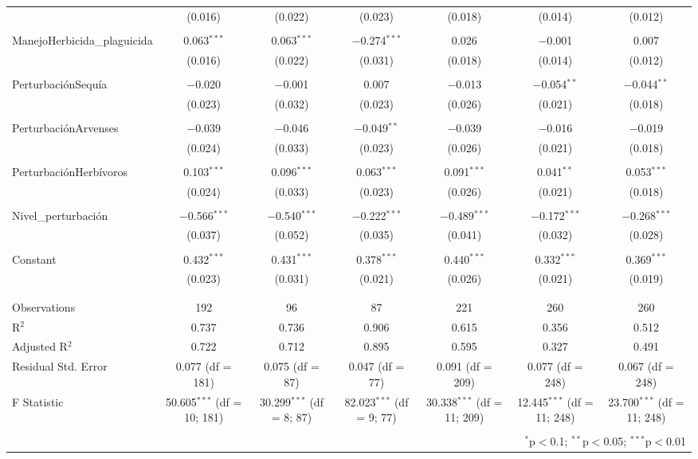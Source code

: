 \documentclass[spanish,11pt]{article}
\begin{document}
\begin{table}[!htbp]
\begin{tabular}{@{\extracolsep{5pt}}lcccccc}
  & (0.016) & (0.022) & (0.023) & (0.018) & (0.014) & (0.012) \\ 
  & & & & & & \\ 
 ManejoHerbicida\_plaguicida & 0.063$^{***}$ & 0.063$^{***}$ & $-$0.274$^{***}$ & 0.026 & $-$0.001 & 0.007 \\ 
  & (0.016) & (0.022) & (0.031) & (0.018) & (0.014) & (0.012) \\ 
  & & & & & & \\ 
 PerturbaciónSequía & $-$0.020 & $-$0.001 & 0.007 & $-$0.013 & $-$0.054$^{**}$ & $-$0.044$^{**}$ \\ 
  & (0.023) & (0.032) & (0.023) & (0.026) & (0.021) & (0.018) \\ 
  & & & & & & \\ 
 PerturbaciónArvenses & $-$0.039 & $-$0.046 & $-$0.049$^{**}$ & $-$0.039 & $-$0.016 & $-$0.019 \\ 
  & (0.024) & (0.033) & (0.023) & (0.026) & (0.021) & (0.018) \\ 
  & & & & & & \\ 
 PerturbaciónHerbívoros & 0.103$^{***}$ & 0.096$^{***}$ & 0.063$^{***}$ & 0.091$^{***}$ & 0.041$^{**}$ & 0.053$^{***}$ \\ 
  & (0.024) & (0.033) & (0.023) & (0.026) & (0.021) & (0.018) \\ 
  & & & & & & \\ 
 Nivel\_perturbación & $-$0.566$^{***}$ & $-$0.540$^{***}$ & $-$0.222$^{***}$ & $-$0.489$^{***}$ & $-$0.172$^{***}$ & $-$0.268$^{***}$ \\ 
  & (0.037) & (0.052) & (0.035) & (0.041) & (0.032) & (0.028) \\ 
  & & & & & & \\ 
 Constant & 0.432$^{***}$ & 0.431$^{***}$ & 0.378$^{***}$ & 0.440$^{***}$ & 0.332$^{***}$ & 0.369$^{***}$ \\ 
  & (0.023) & (0.031) & (0.021) & (0.026) & (0.021) & (0.019) \\ 
  & & & & & & \\ 
\hline \\[-1.8ex] 
Observations & 192 & 96 & 87 & 221 & 260 & 260 \\ 
R$^{2}$ & 0.737 & 0.736 & 0.906 & 0.615 & 0.356 & 0.512 \\ 
Adjusted R$^{2}$ & 0.722 & 0.712 & 0.895 & 0.595 & 0.327 & 0.491 \\ 
Residual Std. Error & 0.077 (df = 181) & 0.075 (df = 87) & 0.047 (df = 77) & 0.091 (df = 209) & 0.077 (df = 248) & 0.067 (df = 248) \\ 
F Statistic & 50.605$^{***}$ (df = 10; 181) & 30.299$^{***}$ (df = 8; 87) & 82.023$^{***}$ (df = 9; 77) & 30.338$^{***}$ (df = 11; 209) & 12.445$^{***}$ (df = 11; 248) & 23.700$^{***}$ (df = 11; 248) \\ 
\hline 
\hline \\[-1.8ex] 
\multicolumn{7}{r}{$^{*}$p$<$0.1; $^{**}$p$<$0.05; $^{***}$p$<$0.01} \\ 
\end{tabular} 
\end{table} 
\end{document}
